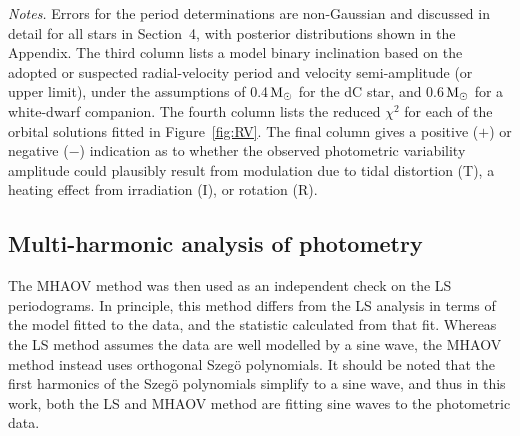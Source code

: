 \documentclass[fleqn,usenatbib,useAMS]{mnras}
\newcommand{\Msun}{\ensuremath{\rm{M}_\odot}}
\begin{document}
\begin{table*}
\begin{tabular}{lcrrcccccrcccc}
\hline
\end{tabular}
\flushleft	
{\em Notes.} Errors for the period determinations are non-Gaussian and discussed in detail for all stars in Section~4, with posterior distributions shown in the Appendix.  The third column lists a model binary inclination based on the adopted or suspected radial-velocity period and velocity semi-amplitude (or upper limit), under the assumptions of 0.4\,$\Msun$ for the dC star, and 0.6\,$\Msun$ for a white-dwarf companion.  The fourth column lists the reduced $\chi^{2}$ for each of the orbital solutions fitted in Figure~\ref{fig:RV}.  The final column gives a positive ($+$) or negative ($-$) indication as to whether the observed photometric variability amplitude could plausibly result from modulation due to tidal distortion (T), a heating effect from irradiation (I), or rotation (R).
\end{table*}





\subsection{Multi-harmonic analysis of photometry}

The MHAOV method was then used as an independent check on the LS periodograms.  In principle, this method differs from the LS analysis in terms of the model fitted to the data, and the statistic calculated from that fit.  Whereas the LS method assumes the data are well modelled by a sine wave, the MHAOV method instead uses orthogonal Szeg\"o polynomials.  It should be noted that the first harmonics of the Szeg\"o polynomials simplify to a sine wave, and thus in this work, both the LS and MHAOV method are fitting sine waves to the photometric data. 
\end{document}
